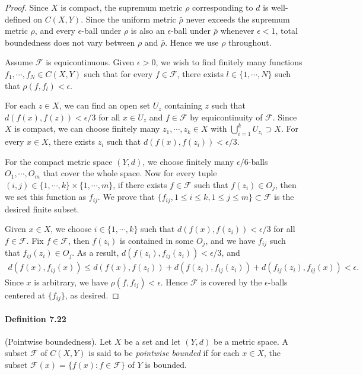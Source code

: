 \documentclass{article}
\numberwithin{equation}{section}
\theoremstyle{plain}
\theoremstyle{definition}
\begin{document}
\begin{proof}
Since $X$ is compact, the supremum metric $\rho$ corresponding to $d$ is well-defined on $C(X,Y)$. Since the uniform metric $\bar{\rho}$ never exceeds the supremum metric $\rho$, and every $\epsilon$-ball under $\rho$ is also an $\epsilon$-ball under $\bar{\rho}$ whenever $\epsilon<1$, total boundedness does not vary between $\rho$ and $\bar{\rho}$. Hence we use $\rho$ throughout.

Assume $\mathcal{F}$ is equicontinuous. Given $\epsilon > 0$, we wish to find finitely many functions $f_1,\cdots,f_N \in C(X,Y)$ such that for every $f\in\mathcal{F}$, there exists $l\in\{1,\cdots,N\}$ such that $\rho(f,f_l)<\epsilon$.

For each $z\in X$, we can find an open set $U_z$ containing $z$ such that $d(f(x),f(z))<\epsilon/3$ for all $x\in U_z$ and $f\in\mathcal{F}$ by equicontinuity of $\mathcal{F}$. Since $X$ is compact, we can choose finitely many $z_1,\cdots,z_k\in X$ with $\bigcup_{i=1}^k U_{z_i}\supset X$. For every $x\in X$, there exists $z_i$ such that $d(f(x),f(z_i))<\epsilon/3$.

For the compact metric space $(Y,d)$, we choose finitely many $\epsilon/6$-balls $O_1,\cdots,O_m$ that cover the whole space. Now for every tuple $(i,j)\in\{1,\cdots,k\}\times\{1,\cdots,m\}$, if there exists $f\in \mathcal{F}$ such that $f(z_i)\in O_j$, then we set this function as $f_{ij}$. We prove that $\{f_{ij},1\leq i\leq k, 1\leq j\leq m\}\subset\mathcal{F}$ is the desired finite subset.

Given $x\in X$, we choose $i\in\{1,\cdots,k\}$ such that $d(f(x),f(z_i))<\epsilon/3$ for all $f\in\mathcal{F}$. Fix $f\in\mathcal{F}$, then $f(z_i)$ is contained in some $O_j$, and we have $f_{ij}$ such that $f_{ij}(z_i)\in O_j$. As a result, $d(f(z_i),f_{ij}(z_i)) < \epsilon/3$, and
\begin{align*}
	d\left(f(x),f_{ij}(x)\right) \leq d\left(f(x),f(z_i)\right) + d\left(f(z_i),f_{ij}(z_i)\right) + d\left(f_{ij}(z_i),f_{ij}(x)\right) < \epsilon.
\end{align*}
Since $x$ is arbitrary, we have $\rho(f,f_{ij})<\epsilon$.  Hence $\mathcal{F}$ is covered by the $\epsilon$-balls centered at $\{f_{ij}\}$, as desired.
\end{proof}

\paragraph{Definition 7.22\label{def:7.22}} (Pointwise boundedness). Let $X$ be a set and let $(Y,d)$ be a metric space. A subset $\mathcal{F}$ of $C(X,Y)$ is said to be \textit{pointwise bounded} if for each $x\in X$, the subset $\mathcal{F}(x)=\{f(x):f\in\mathcal{F}\}$ of $Y$ is bounded.
\end{document}
